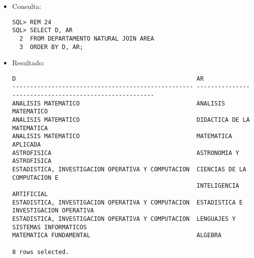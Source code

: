\documentclass[11pt]{report}
\begin{document}
\begin{itemize}
  \item Consulta:
  \begin{verbatim}
SQL> REM 24
SQL> SELECT D, AR
  2  FROM DEPARTAMENTO NATURAL JOIN AREA
  3  ORDER BY D, AR;
  \end{verbatim}
  \item{Resultado:}
  \begin{verbatim}
D                                                   AR                                                                                                                     
--------------------------------------------------- -------------------------------------------------------                                                           
ANALISIS MATEMATICO                                 ANALISIS MATEMATICO                                                                                                    
ANALISIS MATEMATICO                                 DIDACTICA DE LA MATEMATICA                                                                                             
ANALISIS MATEMATICO                                 MATEMATICA APLICADA                                                                                                    
ASTROFISICA                                         ASTRONOMIA Y ASTROFISICA                                                                                               
ESTADISTICA, INVESTIGACION OPERATIVA Y COMPUTACION  CIENCIAS DE LA COMPUTACION E 
                                                    INTELIGENCIA ARTIFICIAL                                                                   
ESTADISTICA, INVESTIGACION OPERATIVA Y COMPUTACION  ESTADISTICA E INVESTIGACION OPERATIVA                                                                                  
ESTADISTICA, INVESTIGACION OPERATIVA Y COMPUTACION  LENGUAJES Y SISTEMAS INFORMATICOS                                                                                      
MATEMATICA FUNDAMENTAL                              ALGEBRA                                                                                                                

8 rows selected.
  \end{verbatim}
\end{itemize}

\end{document}
